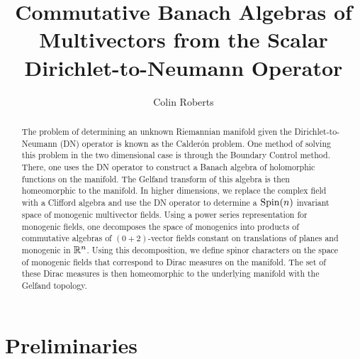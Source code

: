 \documentclass[12pt]{article}
\title{Commutative Banach Algebras of Multivectors from the Scalar Dirichlet-to-Neumann Operator}
\author{Colin Roberts}
\begin{document}
 \begin{titlingpage}
     \maketitle
     \vfill
     \begin{abstract}
        The problem of determining an unknown Riemannian manifold given the Dirichlet-to-Neumann (DN) operator is known as the Calder\'on problem.  One method of solving this problem in the two dimensional case is through the Boundary Control method.  There, one uses the DN operator to construct a Banach algebra of holomorphic functions on the manifold. The Gelfand transform of this algebra is then homeomorphic to the manifold. In higher dimensions, we replace the complex field with a Clifford algebra and use the DN operator to determine a $\operatorname{Spin}(n)$ invariant space of monogenic multivector fields. Using a power series representation for monogenic fields, one decomposes the space of monogenics into products of commutative algebras of $(0+2)$-vector fields constant on translations of planes and monogenic in $\mathbb{R}^n$. Using this decomposition, we define spinor characters on the space of monogenic fields that correspond to Dirac measures on the manifold.  The set of these Dirac measures is then homeomorphic to the underlying manifold with the Gelfand topology.
     \end{abstract}
 \end{titlingpage}

\tableofcontents

%

\section{Preliminaries}

\end{document}
